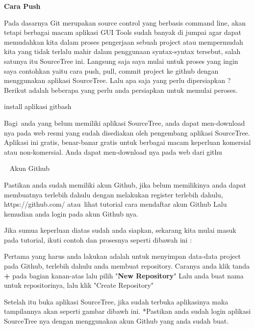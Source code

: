 \vspace{12pt}
\noindent 
\textbf{Cara Push} \par
\vspace{12pt}
\noindent 
Pada dasarnya Git merupakan source control yang berbasis command line, akan tetapi berbagai macam aplikasi GUI Tools sudah banyak di jumpai agar dapat memudahkan kita dalam proses pengerjaan sebuah project atau mempermudah kita yang tidak terlalu mahir dalam penggunaan syntax-syntax tersebut, salah satunya itu SourceTree ini.\vspace{\baselineskip}
\vspace{\baselineskip}
Langsung saja saya mulai untuk proses yang ingin saya contohkan yaitu cara push, pull, commit project ke github dengan menggunakan aplikasi SourceTree. Lalu apa saja yang perlu dipersiapkan ? Berikut adalah beberapa yang perlu anda persiapkan untuk memulai peroses. \par
{} install aplikasi gitbash \par
\noindent 
Bagi~anda yang belum memiliki aplikasi SourceTree, anda dapat men-download nya pada web resmi yang sudah disediakan oleh pengembang aplikasi SourceTree. Aplikasi ini gratis, benar-banar gratis untuk berbagai macam keperluan komersial atau non-komersial. Anda dapat men-download nya pada  web dari githu \par
{}~ Akun Github \par
\noindent 
Pastikan anda sudah memiliki akun Github, jika belum memilikinya anda dapat membuatnya terlebih dahulu dengan melakukan register terlebih dahulu, $  $https://github.com/ $  $atau~lihat tutorial cara mendaftar akun Github  Lalu kemudian anda login pada akun Github nya. \par
\vspace{12pt}
\noindent 
Jika sumua keperluan diatas sudah anda siapkan, sekarang kita mulai masuk pada tutorial, ikuti contoh dan prosesnya seperti dibawah ini : \par
\vspace{12pt}
\noindent 
Pertama yang harus anda lakukan adalah untuk menyimpan data-data project pada Github, terlebih dahulu anda membuat repository. Caranya anda klik tanda $  $\textbf{+} pada bagian kanan-atas lalu pilih "\textbf{New Repository}" Lalu anda buat nama untuk repositorinya, lalu klik "Create Repository"  \par
\vspace{12pt}
\noindent 
Setelah itu buka aplikasi SourceTree, jika sudah terbuka aplikasinya maka tampilannya akan seperti gambar dibawh ini. *Pastikan anda sudah login aplikasi SourceTree nya dengan menggunakan akun Github yang anda sudah buat. \par

